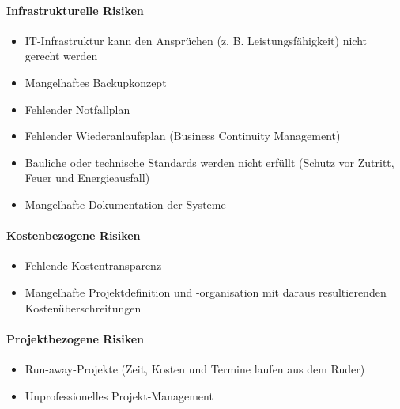 \documentclass[10pt,a4paper]{article}
\begin{document}
\paragraph*{Infrastrukturelle Risiken}
\begin{itemize}[noitemsep,topsep=0pt,leftmargin=*]
    \item IT-Infrastruktur kann den Ansprüchen (z. B.
    Leistungsfähigkeit) nicht gerecht werden
    \item Mangelhaftes Backupkonzept
    \item Fehlender Notfallplan
    \item Fehlender Wiederanlaufsplan (Business Continuity
    Management)
    \item Bauliche oder technische Standards werden nicht erfüllt
    (Schutz vor Zutritt, Feuer und Energieausfall)
    \item Mangelhafte Dokumentation der Systeme
\end{itemize}

\paragraph*{Kostenbezogene Risiken}
\begin{itemize}[noitemsep,topsep=0pt,leftmargin=*]
    \item Fehlende Kostentransparenz
    \item Mangelhafte Projektdefinition und -organisation mit
    daraus resultierenden Kostenüberschreitungen
\end{itemize}

\paragraph*{Projektbezogene Risiken}
\begin{itemize}[noitemsep,topsep=0pt,leftmargin=*]
    \item Run-away-Projekte (Zeit, Kosten und Termine laufen aus
    dem Ruder)
    \item Unprofessionelles Projekt-Management
\end{itemize}
\end{document}
